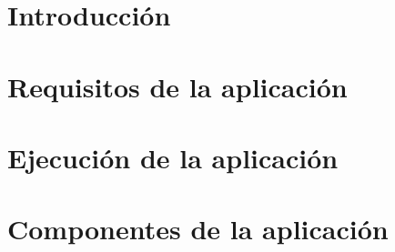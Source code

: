 



	\begin{titlepage}
		
	\end{titlepage}
	
	\tableofcontents
	\newpage
	
    \section{Introducción}
        
        \newpage
        
    \section{Requisitos de la aplicación}
        
        \newpage
        
    \section{Ejecución de la aplicación}
        
        \newpage
        
    \section{Componentes de la aplicación}
        
		\newpage


